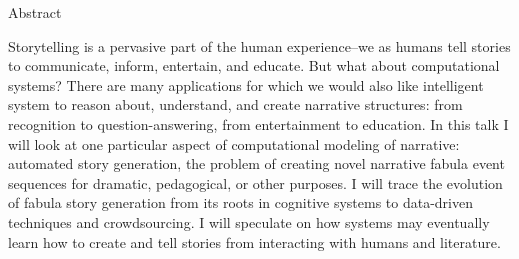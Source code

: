 {\large Abstract}

Storytelling is a pervasive part of the human experience--we as humans tell stories to communicate, inform, entertain, and educate. But what about computational systems? There are many applications for which we would also like intelligent system to reason about, understand, and create narrative structures: from recognition to question-answering, from entertainment to education. In this talk I will look at one particular aspect of computational modeling of narrative: automated story generation, the problem of creating novel narrative fabula event sequences for dramatic, pedagogical, or other purposes. I will trace the evolution of fabula story generation from its roots in cognitive systems to data-driven techniques and crowdsourcing. I will speculate on how systems may eventually learn how to create and tell stories from interacting with humans and literature.